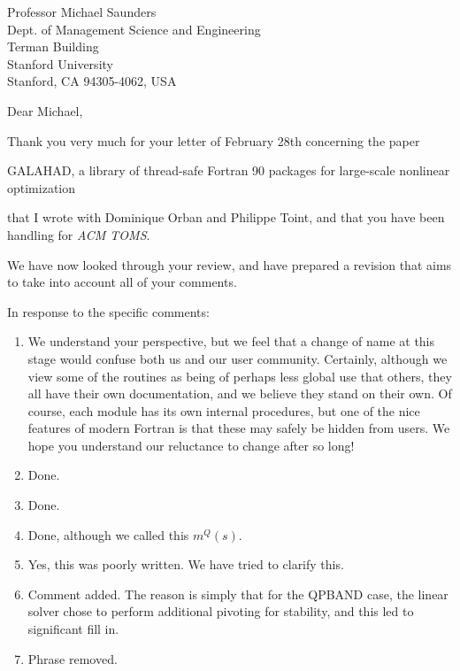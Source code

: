 \documentclass[12pt,a4paper]{letter}
\newcommand{\gal}{{\sf GALAHAD}}
\begin{document}
\begin{letter}{Professor Michael Saunders \\
Dept. of Management Science and Engineering \\
Terman Building \\
Stanford University \\
Stanford, CA 94305-4062, USA}

\noindent
\opening{Dear Michael,}
   
Thank you very much for your letter of  February 28th concerning the paper
\begin{center}
 \gal, a library of thread-safe Fortran 90 
packages for large-scale nonlinear optimization
\end{center}
that I wrote with Dominique Orban and Philippe Toint, and that
you have been handling for {\em ACM TOMS}.

We have now looked through your review, and have prepared a
revision that aims to take into account all of your comments.

In response to the specific comments:

\begin{enumerate}
\item We understand your perspective, but we feel that a change of
name at this stage would confuse both us and our user community.
Certainly, although we view some of the routines as being of perhaps
less global use that others, they all have their own documentation,
and we believe they stand on their own. Of course, each module has
its own internal procedures, but one of the nice features of
modern Fortran is that these may safely be hidden from users. We hope
you understand our reluctance to change after so long!

\item Done.

\item Done.

\item Done, although we called this $m^Q(s)$.

\item Yes, this was poorly written. We have tried to clarify this.

\item Comment added. The reason is simply that for the QPBAND case, 
the linear solver chose to perform additional pivoting for stability,
and this led to significant fill in.

\item Phrase removed.


\end{enumerate}
\end{letter}
\end{document}
